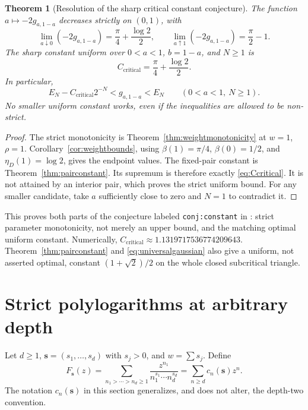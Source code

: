\documentclass[11pt]{article}
\numberwithin{equation}{section}
\newtheorem{theorem}{Theorem}[section]
\theoremstyle{definition}
\theoremstyle{remark}
\newcommand{\sv}{\boldsymbol s}
\begin{document}
\begin{theorem}[Resolution of the sharp critical constant conjecture]
\label{thm:criticalconstant}
The function $a\mapsto-2g_{a,1-a}$ decreases strictly on $(0,1)$, with
\begin{equation}\label{eq:criticalendpoints}
 \lim_{a\downarrow0}(-2g_{a,1-a})=\frac\pi4+\frac{\log2}{2},
 \qquad
 \lim_{a\uparrow1}(-2g_{a,1-a})=\frac\pi2-1.
\end{equation}
The sharp constant uniform over $0<a<1$, $b=1-a$, and $N\ge1$ is
\begin{equation}\label{eq:Ccritical}
 \boxed{C_{\mathrm{critical}}=\frac\pi4+\frac{\log2}{2}.}
\end{equation}
In particular,
\begin{equation}\label{eq:criticalenclosure}
 E_N-C_{\mathrm{critical}}2^{-N}<g_{a,1-a}<E_N
 \qquad(0<a<1,\ N\ge1).
\end{equation}
No smaller uniform constant works, even if the inequalities are
allowed to be non-strict.
\end{theorem}
\begin{proof}
The strict monotonicity is Theorem~\ref{thm:weightmonotonicity} at
$w=1$, $\rho=1$. Corollary~\ref{cor:weightbounds}, using
$\beta(1)=\pi/4$, $\beta(0)=1/2$, and $\eta_D(1)=\log2$, gives the
endpoint values. The fixed-pair constant is
Theorem~\ref{thm:pairconstant}. Its supremum is therefore exactly
\eqref{eq:Ccritical}. It is not attained by an interior pair, which
proves the strict uniform bound. For any smaller candidate, take
$a$ sufficiently close to zero and $N=1$ to contradict it.
\end{proof}

This proves both parts of the conjecture labeled \texttt{conj:constant}
in \cite{threshold}: strict parameter monotonicity, not merely an
upper bound, and the matching optimal uniform constant. Numerically,
$C_{\mathrm{critical}}\approx1.1319717536774209643$.
Theorem~\ref{thm:pairconstant} and \eqref{eq:universalgaussian} also give
a uniform, not asserted optimal, constant $(1+\sqrt2)/2$ on the whole
closed subcritical triangle.

\section{Strict polylogarithms at arbitrary depth}
\label{sec:depth}
Let $d\ge1$, $\sv=(s_1,\ldots,s_d)$ with $s_j>0$, and $w=\sum s_j$.
Define
\begin{equation}\label{eq:strictdepth}
 F_{\sv}(z)=\sum_{n_1>\cdots>n_d\ge1}
                  \frac{z^{n_1}}{n_1^{s_1}\cdots n_d^{s_d}}
           =\sum_{n\ge d}c_n(\sv)z^n.
\end{equation}
The notation $c_n(\sv)$ in this section generalizes, and does not alter,
the depth-two convention.
\end{document}
